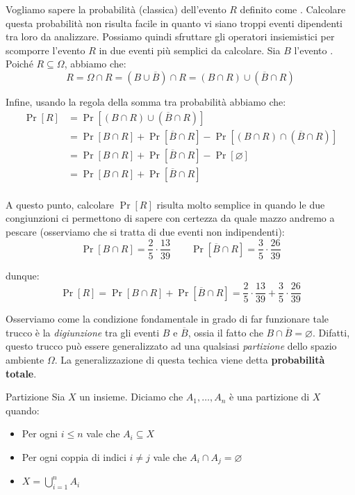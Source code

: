 \documentclass[a4paper, 12pt]{report}
\begin{document}
    Vogliamo sapere la probabilità (classica) dell'evento $R$ definito come . Calcolare questa probabilità non risulta facile in quanto vi siano troppi eventi dipendenti tra loro da analizzare. Possiamo quindi sfruttare gli operatori insiemistici per scomporre l'evento $R$ in due eventi più semplici da calcolare. Sia $B$ l'evento . Poiché $R \subseteq \Omega$, abbiamo che:
    \[R = \Omega \cap R = (B \cup \overline{B}) \cap R = (B \cap R) \cup (\overline{B} \cap R)\]

    Infine, usando la regola della somma tra probabilità abbiamo che:
    \[\begin{split}
        \Pr[R] &= \Pr[(B \cap R) \cup (\overline{B} \cap R)] \\
        &= \Pr[B \cap R] + \Pr[\overline{B} \cap R] - \Pr[(B \cap R) \cap (\overline{B} \cap R)] \\
        &= \Pr[B \cap R] + \Pr[\overline{B} \cap R] - \Pr[\varnothing] \\
        &= \Pr[B \cap R] + \Pr[\overline{B} \cap R]\\
    \end{split}\]

    A questo punto, calcolare $\Pr[R]$ risulta molto semplice in quando le due congiunzioni ci permettono di sapere con certezza da quale mazzo andremo a pescare (osserviamo che si tratta di due eventi non indipendenti):
    \[\Pr[B \cap R] = \frac{2}{5} \cdot \frac{13}{39} \qquad \Pr[\overline{B} \cap R] = \frac{3}{5} \cdot \frac{26}{39}\] 

    dunque:
    \[\Pr[R] = \Pr[B \cap R] + \Pr[\overline{B} \cap R] = \frac{2}{5} \cdot \frac{13}{39} + \frac{3}{5} \cdot \frac{26}{39}\]

    Osserviamo come la condizione fondamentale in grado di far funzionare tale trucco è la \textit{digiunzione} tra gli eventi $B$ e $\overline{B}$, ossia il fatto che $B \cap \overline{B} = \varnothing$. Difatti, questo trucco può essere generalizzato ad una qualsiasi \textit{partizione} dello spazio ambiente $\Omega$. La generalizzazione di questa techica viene detta \textbf{probabilità totale}.

    \begin{frameddefn}{Partizione}
        Sia $X$ un insieme. Diciamo che $A_1, \ldots, A_n$ è una partizione di $X$ quando:
        \begin{itemize}
            \item Per ogni $i \leq n$ vale che $A_i \subseteq X$
            \item Per ogni coppia di indici $i \neq j$ vale che $A_i \cap A_j = \varnothing$
            \item $X = \bigcup_{i = 1}^n A_i$
        \end{itemize}
    \end{frameddefn}
\end{document}
